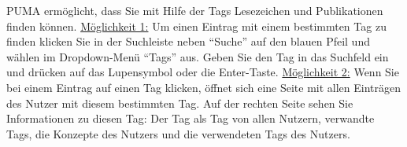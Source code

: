 PUMA ermöglicht, dass Sie mit Hilfe der Tags Lesezeichen und Publikationen finden können. \newline\newline
\underline{Möglichkeit 1:} Um einen Eintrag mit einem bestimmten Tag zu finden klicken Sie in der Suchleiste neben \enquote{Suche} auf den blauen Pfeil und wählen im Dropdown-Menü \enquote{Tags} aus. Geben Sie den Tag in das Suchfeld ein und drücken auf das Lupensymbol oder die Enter-Taste.\newline \newline
\underline{Möglichkeit 2:} Wenn Sie bei einem Eintrag auf einen Tag klicken, öffnet sich eine Seite mit allen Einträgen des Nutzer mit diesem bestimmten Tag. Auf der rechten Seite sehen Sie Informationen zu diesen Tag: Der Tag als Tag von allen Nutzern, verwandte Tags, die Konzepte des Nutzers und die verwendeten Tags des Nutzers. 
\newline
\newline

